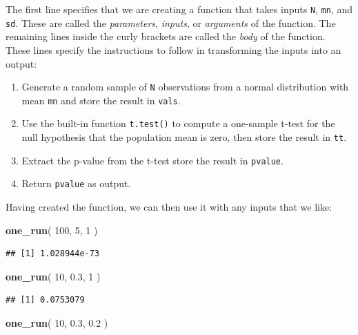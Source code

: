 \documentclass[
]{book}
\newenvironment{Shaded}{\begin{snugshade}}{\end{snugshade}}
\newcommand{\DecValTok}[1]{\textcolor[rgb]{0.00,0.00,0.81}{#1}}
\newcommand{\FloatTok}[1]{\textcolor[rgb]{0.00,0.00,0.81}{#1}}
\newcommand{\FunctionTok}[1]{\textcolor[rgb]{0.13,0.29,0.53}{\textbf{#1}}}
\newcommand{\NormalTok}[1]{#1}
\providecommand{\tightlist}{%
  \setlength{\itemsep}{0pt}\setlength{\parskip}{0pt}}
\begin{document}
The first line specifies that we are creating a function that takes inputs \texttt{N}, \texttt{mn}, and \texttt{sd}. These are called the \emph{parameters}, \emph{inputs}, or \emph{arguments} of the function. The remaining lines inside the curly brackets are called the \emph{body} of the function. These lines specify the instructions to follow in transforming the inputs into an output:

\begin{enumerate}
\def\labelenumi{\arabic{enumi}.}
\tightlist
\item
  Generate a random sample of \texttt{N} observations from a normal distribution with mean \texttt{mn} and store the result in \texttt{vals}.
\item
  Use the built-in function \texttt{t.test()} to compute a one-sample t-test for the null hypothesis that the population mean is zero, then store the result in \texttt{tt}.
\item
  Extract the p-value from the t-test store the result in \texttt{pvalue}.
\item
  Return \texttt{pvalue} as output.
\end{enumerate}

Having created the function, we can then use it with any inputs that we like:

\begin{Shaded}
\begin{Highlighting}[]
\FunctionTok{one\_run}\NormalTok{( }\DecValTok{100}\NormalTok{, }\DecValTok{5}\NormalTok{, }\DecValTok{1}\NormalTok{ )}
\end{Highlighting}
\end{Shaded}

\begin{verbatim}
## [1] 1.028944e-73
\end{verbatim}

\begin{Shaded}
\begin{Highlighting}[]
\FunctionTok{one\_run}\NormalTok{( }\DecValTok{10}\NormalTok{, }\FloatTok{0.3}\NormalTok{, }\DecValTok{1}\NormalTok{ )}
\end{Highlighting}
\end{Shaded}

\begin{verbatim}
## [1] 0.0753079
\end{verbatim}

\begin{Shaded}
\begin{Highlighting}[]
\FunctionTok{one\_run}\NormalTok{( }\DecValTok{10}\NormalTok{, }\FloatTok{0.3}\NormalTok{, }\FloatTok{0.2}\NormalTok{ )}
\end{Highlighting}
\end{Shaded}
\end{document}
